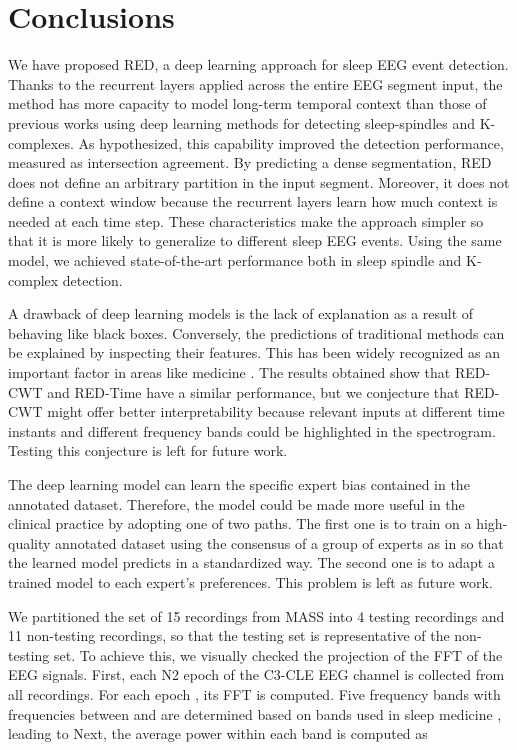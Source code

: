 \documentclass[conference]{IEEEtran}
\begin{document}
\section{Conclusions}


We have proposed RED, a deep learning approach for sleep EEG event detection. Thanks to the recurrent layers applied across the entire EEG segment input, the method has more capacity to model long-term temporal context than those of previous works using deep learning methods for detecting sleep-spindles and K-complexes. As hypothesized, this capability improved the detection performance, measured as intersection agreement. By predicting a dense segmentation, RED does not define an arbitrary partition in the input segment. Moreover, it does not define a context window because the recurrent layers learn how much context is needed at each time step. These characteristics make the approach simpler so that it is more likely to generalize to different sleep EEG events. Using the same model, we achieved state-of-the-art performance both in sleep spindle and K-complex detection.

A drawback of deep learning models is the lack of explanation as a result of behaving like black boxes. Conversely, the predictions of traditional methods can be explained by inspecting their features. This has been widely recognized as an important factor in areas like medicine \cite{adadi2018peeking}. The results obtained show that RED-CWT and RED-Time have a similar performance, but we conjecture that RED-CWT might offer better interpretability because relevant inputs at different time instants and different frequency bands could be highlighted in the spectrogram. Testing this conjecture is left for future work.

The deep learning model can learn the specific expert bias contained in the annotated dataset. Therefore, the model could be made more useful in the clinical practice by adopting one of two paths. The first one is to train on a high-quality annotated dataset using the consensus of a group of experts as in \cite{warby2014sleep} so that the learned model predicts in a standardized way. The second one is to adapt a trained model to each expert's preferences. This problem is left as future work.

\appendix

We partitioned the set of 15 recordings from MASS into 4 testing recordings and 11 non-testing recordings, so that the testing set is representative of the non-testing set. To achieve this, we visually checked the projection of the FFT of the EEG signals. First, each N2 epoch of the C3-CLE EEG channel is collected from all recordings. For each epoch , its FFT is computed. Five frequency bands  with frequencies  between  and  are determined based on bands used in sleep medicine \cite{berry2012aasm}, leading to
Next, the average power within each band is computed as
\end{document}

